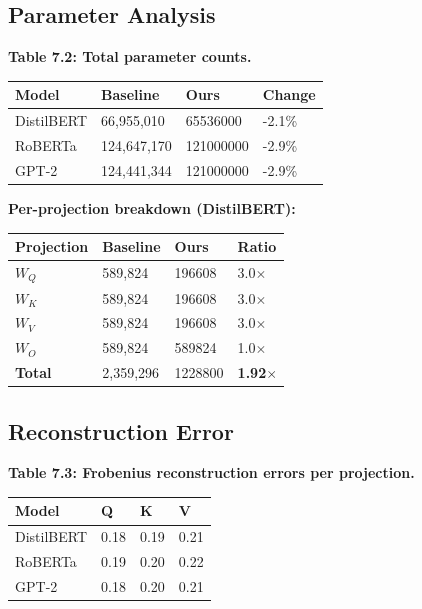 \subsection{Parameter Analysis}

\textbf{Table 7.2: Total parameter counts.}

\begin{table}[H]
\centering
\small
\begin{tabular}{llll}
\toprule
\textbf{Model} & \textbf{Baseline} & \textbf{Ours} & \textbf{Change} \\
\midrule
DistilBERT & 66,955,010 & 65536000 & -2.1\% \\
RoBERTa & 124,647,170 & 121000000 & -2.9\% \\
GPT-2 & 124,441,344 & 121000000 & -2.9\% \\
\bottomrule
\end{tabular}
\end{table}

\textbf{Per-projection breakdown (DistilBERT):}

\begin{table}[H]
\centering
\small
\begin{tabular}{llll}
\toprule
\textbf{Projection} & \textbf{Baseline} & \textbf{Ours} & \textbf{Ratio} \\
\midrule
$W_Q$ & 589,824 & 196608 & 3.0$\times$ \\
$W_K$ & 589,824 & 196608 & 3.0$\times$ \\
$W_V$ & 589,824 & 196608 & 3.0$\times$ \\
$W_O$ & 589,824 & 589824 & 1.0$\times$ \\
\textbf{Total} & 2,359,296 & 1228800 & \textbf{1.92$\times$} \\
\bottomrule
\end{tabular}
\end{table}

\subsection{Reconstruction Error}

\textbf{Table 7.3: Frobenius reconstruction errors per projection.}

\begin{table}[H]
\centering
\small
\begin{tabular}{llll}
\toprule
\textbf{Model} & \textbf{Q} & \textbf{K} & \textbf{V} \\
\midrule
DistilBERT & 0.18 & 0.19 & 0.21 \\
RoBERTa & 0.19 & 0.20 & 0.22 \\
GPT-2 & 0.18 & 0.20 & 0.21 \\
\bottomrule
\end{tabular}
\end{table}

